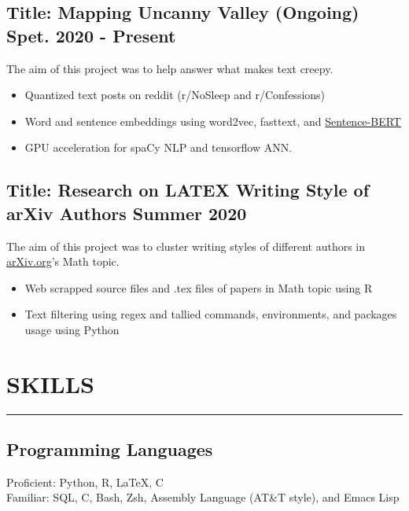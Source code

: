 \documentclass{article}
\newcommand\myshade{85}
\newcommand\CC{C\nolinebreak[4]\hspace{-.05em}\raisebox{.4ex}{\relsize{-3}{\textbf{++}}}}
\newcommand{\divider}{\vskip2pt\hrule\vskip2pt}
\begin{document}
	\hypersetup{urlcolor=myurlcolor!\myshade!black,colorlinks = true}
	
		\subsection*{Title: Mapping Uncanny Valley (Ongoing) \hfill {\normalfont Spet. 2020 - Present}}
		\noindent
		\href{https://github.com/Anthonyive/Research-Mapping-Uncanny-Valley.git}{} The aim of this project was to help answer what makes text creepy.
		\begin{itemize}
			\setlength\itemsep{-1pt}
			\item Quantized text posts on reddit (r/NoSleep and r/Confessions) 
			\item Word and sentence embeddings using word2vec, fasttext, and \href{https://arxiv.org/abs/1908.10084}{Sentence-BERT}
			\item GPU acceleration for spaCy NLP and tensorflow ANN.
		\end{itemize}
	
		\subsection*{Title: Research on LATEX Writing Style of arXiv Authors \hfill {\normalfont Summer 2020}}
		\noindent
		\href{https://github.com/Anthonyive/machine-learning-project.git}{} The aim of this project was to cluster writing styles of different authors in \href{https://arxiv.org}{arXiv.org}’s Math topic. 
		\begin{itemize}
			\setlength\itemsep{-1pt}
			\item Web scrapped source files and .tex files of papers in Math topic using R
			\item Text filtering using regex and tallied commands, environments, and packages usage using Python
		\end{itemize}
	
	\section*{SKILLS}
	\divider
		\subsection*{Programming Languages}
		\noindent
		Proficient: Python, R, \LaTeX, \CC \\ 
		Familiar: SQL, C, Bash, Zsh, Assembly Language (AT\&T style), and Emacs Lisp
	
	
\end{document}
